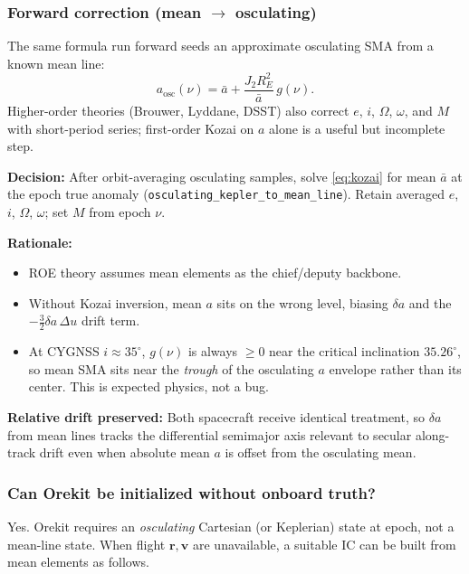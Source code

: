\documentclass[11pt]{article}
\begin{document}
\subsubsection{Forward correction (mean $\to$ osculating)}

The same formula run forward seeds an approximate osculating SMA from a known mean line:
\begin{equation}
a_\mathrm{osc}(\nu) = \bar{a} + \frac{J_2 R_E^2}{\bar{a}}\,g(\nu).
\end{equation}
Higher-order theories (Brouwer, Lyddane, DSST) also correct $e$, $i$, $\Omega$, $\omega$, and $M$ with short-period series; first-order Kozai on $a$ alone is a useful but incomplete step.

\textbf{Decision:} After orbit-averaging osculating samples, solve \eqref{eq:kozai} for mean $\bar{a}$ at the epoch true anomaly (\texttt{osculating\_kepler\_to\_mean\_line}). Retain averaged $e$, $i$, $\Omega$, $\omega$; set $M$ from epoch $\nu$.

\textbf{Rationale:}
\begin{itemize}
    \item ROE theory assumes mean elements as the chief/deputy backbone.
    \item Without Kozai inversion, mean $a$ sits on the wrong level, biasing $\delta a$ and the $-\tfrac{3}{2}\delta a\,\Delta u$ drift term.
    \item At CYGNSS $i \approx 35^\circ$, $g(\nu)$ is always $\geq 0$ near the critical inclination $35.26^\circ$, so mean SMA sits near the \emph{trough} of the osculating $a$ envelope rather than its center. This is expected physics, not a bug.
\end{itemize}

\textbf{Relative drift preserved:} Both spacecraft receive identical treatment, so $\delta a$ from mean lines tracks the differential semimajor axis relevant to secular along-track drift even when absolute mean $a$ is offset from the osculating mean.

\subsubsection{Can Orekit be initialized without onboard truth?}

Yes. Orekit requires an \emph{osculating} Cartesian (or Keplerian) state at epoch, not a mean-line state. When flight $\mathbf{r},\mathbf{v}$ are unavailable, a suitable IC can be built from mean elements as follows.
\end{document}
